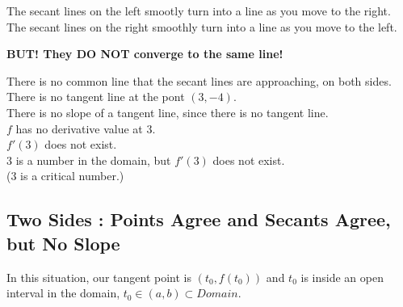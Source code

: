 \documentclass{ximera}
\begin{document}
The secant lines on the left smootly turn into a line as you move to the right. The secant lines on the right smoothly turn into a line as you move to the left. \\


\begin{center}
\textbf{\textcolor{blue!55!black}{BUT!  They DO NOT converge to the same line!}}\\
\end{center}





There is no common line that the secant lines are approaching, on both sides. \\

There is no tangent line at the pont $(3,-4)$. \\

There is no slope of a tangent line, since there is no tangent line. \\

$f$ has no derivative value at $3$.  \\

$f'(3)$ does not exist. \\

$3$ is a number in the domain, but $f'(3)$ does not exist. \\

($3$ is a critical number.)\\

































\subsection*{Two Sides : Points Agree and Secants Agree, but No Slope}


In this situation, our tangent point is $(t_0 , f(t_0))$ and $t_0$ is inside an open interval in the domain, $t_0 \in (a, b) \subset Domain$. \\
\end{document}
